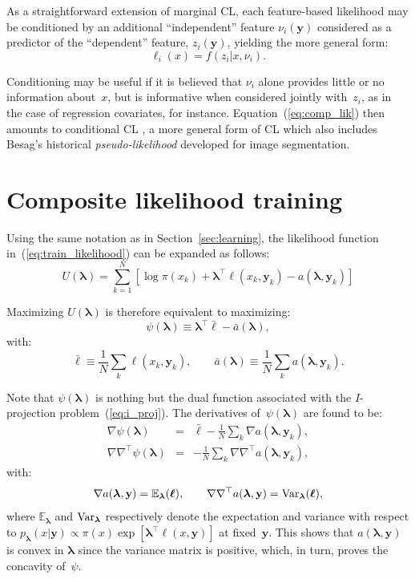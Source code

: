 \documentclass[english]{scrartcl}
\def\y{{\mathbf{y}}}
\newcommand{\blambda}{{\boldsymbol{\lambda}}}
\newcommand{\bell}{{\boldsymbol{\ell}}}
\newcommand{\E}{\mathbb{E}}
\begin{document}
As a straightforward  extension of marginal CL, each feature-based likelihood may be conditioned by an additional ``independent'' feature $\nu_i(\y)$ considered as a predictor of the ``dependent'' feature, $z_i(\y)$, yielding the more general form:
\begin{equation}
\label{eq:cond_feat_lik}
\ell_i(x) = f(z_i|x,\nu_i).
\end{equation}

Conditioning may be useful if it is believed that $\nu_i$ alone provides little or no information about~$x$, but is informative when considered jointly with~$z_i$, as in the case of regression covariates, for instance. Equation~(\ref{eq:comp_lik}) then amounts to conditional CL \cite{Varin-11}, a more general form of CL which also includes Besag's historical {\em pseudo-likelihood} \cite{Besag-74} developed for image segmentation.


\section{Composite likelihood training}
\label{app:training}

Using the same notation as in Section~\ref{sec:learning}, the likelihood function in~(\ref{eq:train_likelihood}) can be expanded as follows:
$$
U(\blambda) 
= \sum_{k=1}^N \left[
\log \pi(x_k) + \blambda^\top \bell(x_k, \y_k) - a(\blambda,\y_k)
\right]
$$

Maximizing $U(\blambda)$ is therefore equivalent to maximizing: 
$$
\psi(\blambda) \equiv \blambda^\top \bar{\bell} - \bar{a}(\blambda), 
$$
with:
$$
\bar{\bell} \equiv \frac{1}{N} \sum_k \bell(x_k,\y_k),
\qquad
\bar{a}(\blambda) \equiv \frac{1}{N} \sum_k a(\blambda,\y_k).
$$

Note that $\psi(\blambda)$ is nothing but the dual function associated with the $I$-projection problem~(\ref{eq:i_proj}). The derivatives of~$\psi(\blambda)$ are found to be:
\begin{eqnarray*}
\nabla\psi(\blambda)
 & = & \bar{\bell} - \frac{1}{N} \sum_k \nabla a(\blambda,\y_k), \\
\nabla\nabla^\top\psi(\blambda)
 & = & - \frac{1}{N} \sum_k \nabla \nabla^\top a(\blambda,\y_k),
\end{eqnarray*}
with:
$$
\nabla a(\blambda,\y) = \E_{\blambda}(\bell),
\qquad
\nabla \nabla^\top a(\blambda,\y) = {\rm Var}_{\blambda}(\bell),
$$
where $\E_{\blambda}$ and ${\rm Var}_{\blambda}$ respectively denote the expectation and variance with respect to $p_\blambda(x|\y)\propto \pi(x)\exp[\blambda^\top \bell(x,\y)]$ at fixed~$\y$. This shows that $a(\blambda,\y)$ is convex in $\blambda$ since the variance matrix is positive, which, in turn, proves the concavity of~$\psi$.
\end{document}
